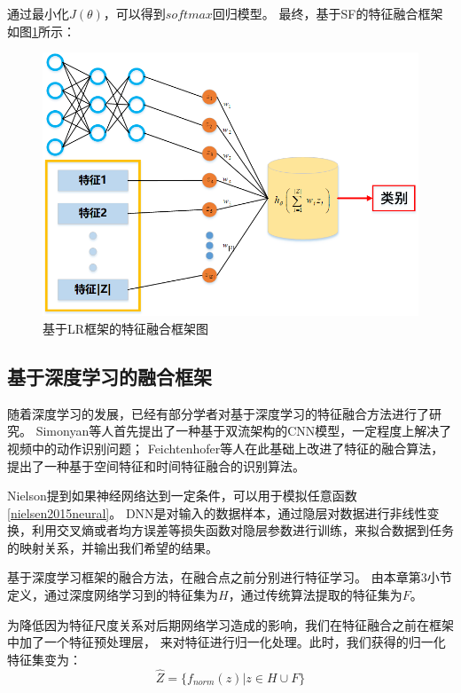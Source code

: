 通过最小化$J(\theta)$，可以得到$softmax$回归模型。
最终，基于SF的特征融合框架如图\ref{sec:fig_4_2}所示：\par
\begin{figure}[!h]
	\centering
	\includegraphics[scale=0.7]{figures/chapter_4/fig_4_2}
	\caption{基于LR框架的特征融合框架图}\label{sec:fig_4_2}
\end{figure}


\subsection{基于深度学习的融合框架}
随着深度学习的发展，已经有部分学者对基于深度学习的特征融合方法进行了研究\cite{马永军2017一种基于深度学习模型的数据融合处理算法}\cite{王维智2015基于特征提取和特征选择的级联深度学习模型研究}。
Simonyan等人首先提出了一种基于双流架构的CNN模型，一定程度上解决了视频中的动作识别问题\cite{simonyan2014two}；
Feichtenhofer等人在此基础上改进了特征的融合算法，提出了一种基于空间特征和时间特征融合的识别算法\cite{feichtenhofer2016convolutional}。\par

Nielson提到如果神经网络达到一定条件，可以用于模拟任意函数\ref{nielsen2015neural}。
DNN是对输入的数据样本，通过隐层对数据进行非线性变换，利用交叉熵或者均方误差等损失函数对隐层参数进行训练，来拟合数据到任务的映射关系，并输出我们希望的结果。\par

基于深度学习框架的融合方法，在融合点之前分别进行特征学习。
由本章第3小节定义，通过深度网络学习到的特征集为$H$，通过传统算法提取的特征集为$F$。\par

为降低因为特征尺度关系对后期网络学习造成的影响，我们在特征融合之前在框架中加了一个特征预处理层，
来对特征进行归一化处理。此时，我们获得的归一化特征集变为：
\begin{equation}
	\label{eqt_4_23}
	\hat{Z} =\{ f_{norm}(z) | z \in H \cup F \}
\end{equation}


